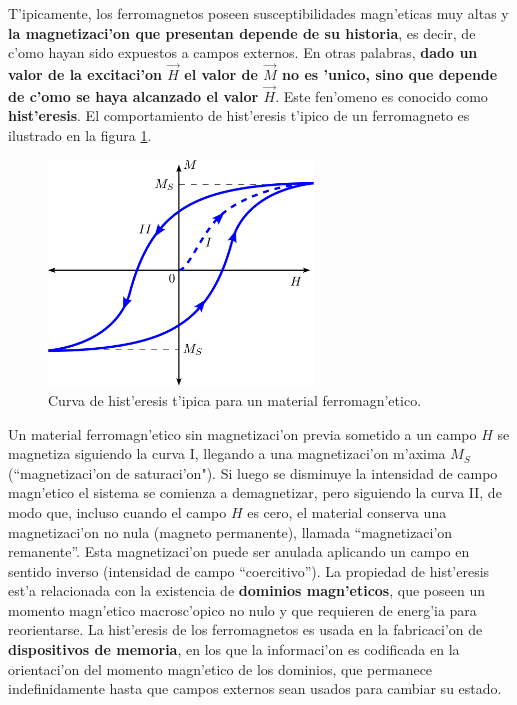 T'ipicamente, los ferromagnetos poseen susceptibilidades
magn'eticas muy altas y \textbf{la magnetizaci'on que presentan depende de
su historia}, es decir, de c'omo hayan sido expuestos a campos externos. En
otras palabras, \textbf{dado un valor de la excitaci'on $\vec{H}$ el valor de $\vec{M}$
no es 'unico, sino que depende de c'omo se haya alcanzado el valor $\vec{H}$}.
Este fen'omeno es conocido como \textbf{hist'eresis}. El comportamiento de
hist'eresis t'ipico de un ferromagneto es ilustrado en la figura
\ref{fig-histeresis}.
\begin{figure}[!h]
\centerline{\includegraphics[height=6cm]{fig/fig-histeresis-01.pdf}}
\caption{Curva de hist'eresis t'ipica para un material ferromagn'etico.}
\label{fig-histeresis}
\end{figure}
Un material ferromagn'etico sin magnetizaci'on previa sometido a un campo $H$
se magnetiza siguiendo la curva I, llegando a una magnetizaci'on m'axima $M_S$ (``magnetizaci'on de saturaci'on"). 
Si luego se disminuye la intensidad de campo magn'etico el sistema se comienza
a demagnetizar, pero siguiendo la curva II, de modo que, incluso cuando el
campo $H$ es cero, el material conserva una magnetizaci'on no nula (magneto
permanente), llamada ``magnetizaci'on remanente''. Esta magnetizaci'on puede
ser anulada aplicando un campo en sentido inverso (intensidad de campo
``coercitivo''). La propiedad de hist'eresis est'a relacionada con la existencia
de \textbf{dominios magn'eticos}, que poseen un momento magn'etico macrosc'opico
no nulo y que requieren de energ'ia para reorientarse. La hist'eresis de los
ferromagnetos es usada en la fabricaci'on de \textbf{dispositivos de memoria}, en los
que la informaci'on es codificada en la orientaci'on del momento magn'etico de
los dominios, que permanece indefinidamente hasta que campos externos sean
usados para cambiar su estado.